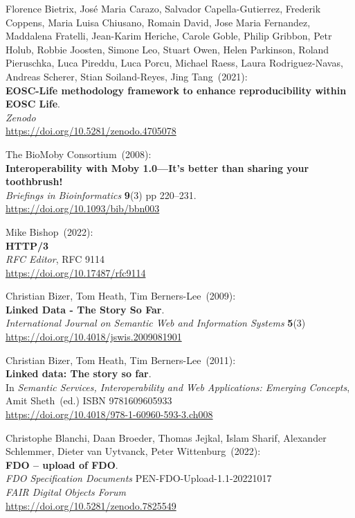 \begin{thebibliography}{9}
Florence Bietrix, José Maria Carazo, Salvador Capella-Gutierrez, Frederik Coppens, Maria Luisa Chiusano, Romain David, Jose Maria Fernandez, Maddalena Fratelli, Jean-Karim Heriche, Carole Goble, Philip Gribbon, Petr Holub, Robbie Joosten, Simone Leo, Stuart Owen, Helen Parkinson, Roland Pieruschka, Luca Pireddu, Luca Porcu, Michael Raess, Laura Rodriguez-Navas, Andreas Scherer, Stian Soiland-Reyes, Jing Tang~(2021): \\
\textbf{EOSC-Life methodology framework to enhance reproducibility within EOSC Life}.\\
\emph{Zenodo}\\
\url{https://doi.org/10.5281/zenodo.4705078}

The BioMoby Consortium~(2008): \\
\textbf{Interoperability with Moby 1.0---It's better than sharing your toothbrush!}\\
\emph{Briefings in Bioinformatics} \textbf{9}(3) pp
220--231.\\
\url{https://doi.org/10.1093/bib/bbn003}

Mike Bishop~(2022): \\
\textbf{{HTTP}/3}\\
\emph{RFC Editor}, RFC 9114 \\
\url{https://doi.org/10.17487/rfc9114}

Christian Bizer, Tom Heath, Tim Berners-Lee~(2009): \\
\textbf{Linked Data - The Story So Far}.\\
\emph{International Journal on Semantic Web and Information Systems}
\textbf{5}(3)\\
\url{https://doi.org/10.4018/jswis.2009081901}

Christian Bizer, Tom Heath, Tim Berners-Lee~(2011): \\
\textbf{Linked data: The story so far}.\\
In \emph{Semantic Services, Interoperability and Web Applications: Emerging Concepts}, Amit Sheth~(ed.) ISBN 9781609605933\\
\url{https://doi.org/10.4018/978-1-60960-593-3.ch008}

Christophe Blanchi, Daan Broeder, Thomas Jejkal, Islam Sharif, Alexander Schlemmer, Dieter van Uytvanck, Peter Wittenburg~(2022): \\
\textbf{FDO -- upload of FDO}.\\
\emph{FDO Specification Documents} PEN-FDO-Upload-1.1-20221017 \\
\emph{FAIR Digital Objects Forum}\\
\url{https://doi.org/10.5281/zenodo.7825549}


\end{thebibliography}
